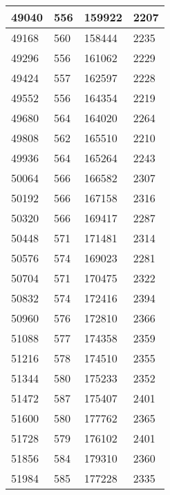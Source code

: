 \begin{longtable}{|l|l|l|l|}
		49040 & 556         & 159922          & 2207             \\ \hline
		49168 & 560         & 158444          & 2235             \\ \hline
		49296 & 556         & 161062          & 2229             \\ \hline
		49424 & 557         & 162597          & 2228             \\ \hline
		49552 & 556         & 164354          & 2219             \\ \hline
		49680 & 564         & 164020          & 2264             \\ \hline
		49808 & 562         & 165510          & 2210             \\ \hline
		49936 & 564         & 165264          & 2243             \\ \hline
		50064 & 566         & 166582          & 2307             \\ \hline
		50192 & 566         & 167158          & 2316             \\ \hline
		50320 & 566         & 169417          & 2287             \\ \hline
		50448 & 571         & 171481          & 2314             \\ \hline
		50576 & 574         & 169023          & 2281             \\ \hline
		50704 & 571         & 170475          & 2322             \\ \hline
		50832 & 574         & 172416          & 2394             \\ \hline
		50960 & 576         & 172810          & 2366             \\ \hline
		51088 & 577         & 174358          & 2359             \\ \hline
		51216 & 578         & 174510          & 2355             \\ \hline
		51344 & 580         & 175233          & 2352             \\ \hline
		51472 & 587         & 175407          & 2401             \\ \hline
		51600 & 580         & 177762          & 2365             \\ \hline
		51728 & 579         & 176102          & 2401             \\ \hline
		51856 & 584         & 179310          & 2360             \\ \hline
		51984 & 585         & 177228          & 2335             \\ \hline

\end{longtable}
